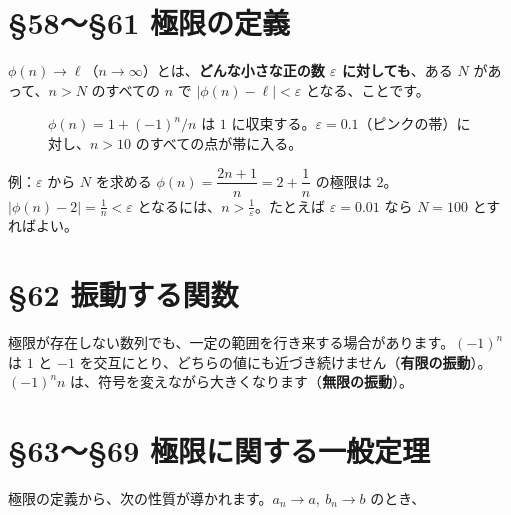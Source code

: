 \documentclass[a4paper,11pt,openany]{ltjsbook}
\begin{document}
\section{§58〜§61 極限の定義}

$\phi(n)\to\ell$（$n\to\infty$）とは、\textbf{どんな小さな正の数 $\varepsilon$ に対しても}、ある $N$ があって、$n>N$ のすべての $n$ で $|\phi(n)-\ell|<\varepsilon$ となる、ことです。

\begin{figure}[htbp]
\centering
{}
\caption{$\phi(n)=1+(-1)^n/n$ は $1$ に収束する。$\varepsilon=0.1$（ピンクの帯）に対し、$n>10$ のすべての点が帯に入る。}
\end{figure}

\begin{examplebox}{例：$\varepsilon$ から $N$ を求める}
$\phi(n)=\dfrac{2n+1}{n}=2+\dfrac1n$ の極限は $2$。$|\phi(n)-2|=\frac1n<\varepsilon$ となるには、$n>\frac1\varepsilon$。たとえば $\varepsilon=0.01$ なら $N=100$ とすればよい。
\end{examplebox}

\section{§62 振動する関数}

極限が存在しない数列でも、一定の範囲を行き来する場合があります。$(-1)^n$ は $1$ と $-1$ を交互にとり、どちらの値にも近づき続けません（\textbf{有限の振動}）。$(-1)^nn$ は、符号を変えながら大きくなります（\textbf{無限の振動}）。

\section{§63〜§69 極限に関する一般定理}

極限の定義から、次の性質が導かれます。$a_n\to a,\ b_n\to b$ のとき、
\end{document}
